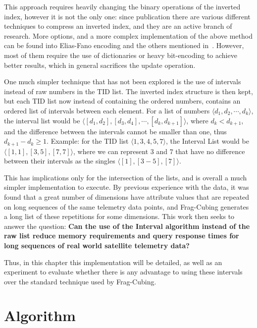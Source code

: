 This approach requires heavily changing the binary operations of the inverted index, however it is not the only one: since publication there are various different techniques to compress an inverted index, and they are an active branch of research.
More options, and a more complex implementation of the above method can be found into Elias-Fano encoding and the others mentioned in~.
However, most of them require the use of dictionaries or heavy bit-encoding to achieve better results, which in general sacrifices the update operation.

One much simpler technique that has not been explored is the use of intervals instead of raw numbers in the TID list.
The inverted index structure is then kept, but each TID list now instead of containing the ordered numbers, contains an ordered list of intervals between each element.
For a list of numbers $\langle d_1, d_2 , \cdots, d_k \rangle$, the interval list would be $\langle [d_1, d_2] , [d_3, d_4], \cdots, [d_k, d_{k + 1}] \rangle$, where $d_k < d_{k+1}$, and the difference between the intervals cannot be smaller than one, thus $d_{k+1} - d_k \geq 1$.
Example: for the TID list $\langle 1, 3, 4, 5, 7 \rangle$, the Interval List would be $\langle [1, 1], [3, 5], [7, 7] \rangle$, where we can represent $3$ and $7$ that have no difference between their intervals as the singles $\langle [1], [3-5], [7] \rangle$.

This has implications only for the intersection of the lists, and is overall a much simpler implementation to execute.
By previous experience with the data, it was found that a great number of dimensions have attribute values that are repeated on long sequences of the same telemetry data points, and Frag-Cubing generates a long list of these repetitions for some dimensions.
This work then seeks to answer the question: \textbf{Can the use of the Interval algorithm instead of the raw list reduce memory requirements and query response times for long sequences of real world satellite telemetry data?}

Thus, in this chapter this implementation will be detailed, as well as an experiment to evaluate whether there is any advantage to using these intervals over the standard technique used by Frag-Cubing.

\section{Algorithm}\label{ch:interval:algo}

